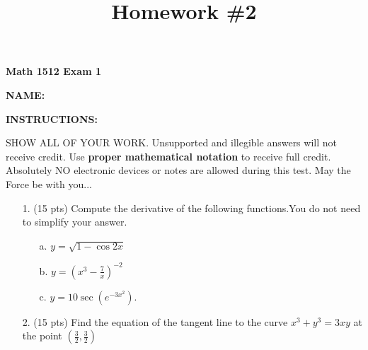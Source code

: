 \documentclass[11pt,reqno]{article}
\title{Homework \#2}
\theoremstyle{definition}
\begin{document}
\centerline{\textbf{\Large{Math 1512 Exam 1}}}

\vspace{0.12in}

\textbf{NAME:}\hrulefill

\vspace{0.2in}


\textbf{INSTRUCTIONS:}

SHOW ALL OF YOUR WORK. Unsupported and illegible answers will not receive credit. Use\textbf{ proper mathematical notation} to receive full credit.
Absolutely NO electronic devices or notes are allowed during this test. May the Force be with you...
	
	\begin{enumerate}
		\item[1.] (15 pts) Compute the derivative of the following functions.You do not need to simplify your answer. 
		\begin{enumerate}
			\item[a.] $y = \sqrt{1 - \cos 2x}$
			\vspace{6cm}
			\item[b.] $y = \left(x^3 - \frac{7}{x}\right)^{-2}$
			\vspace{6cm} 
			\item[c.] $y = 10 \sec(e^{-3x^2})$. 
		\end{enumerate}
	\newpage
	\item[2.] (15 pts) Find the equation of the tangent line to the curve $x^3 + y^3 = 3xy$ at the point $\left(\frac{3}{2}, \frac{3}{2}\right)$ 
		
		
		
		
		
		
		
		
		
		
		
		\newpage 
		

\end{enumerate}
\end{document}
